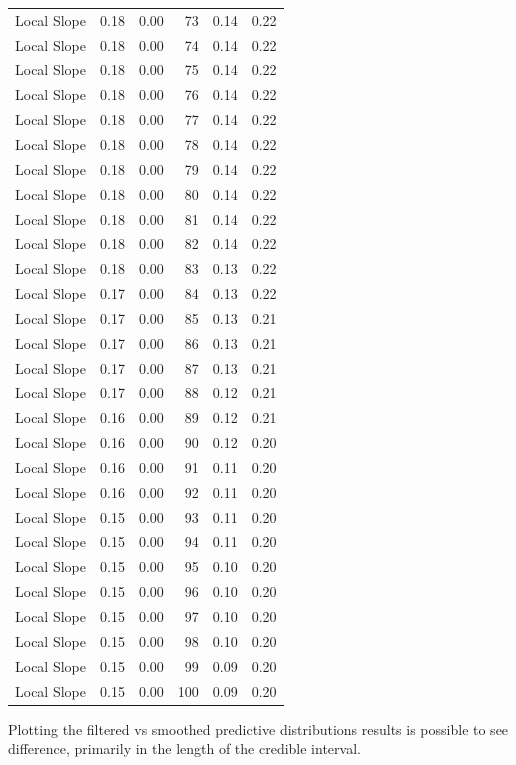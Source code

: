 \documentclass[
]{article}
\begin{document}
\begin{longtable}[]{@{}lrrrrr@{}}
Local Slope & 0.18 & 0.00 & 73 & 0.14 & 0.22 \\
Local Slope & 0.18 & 0.00 & 74 & 0.14 & 0.22 \\
Local Slope & 0.18 & 0.00 & 75 & 0.14 & 0.22 \\
Local Slope & 0.18 & 0.00 & 76 & 0.14 & 0.22 \\
Local Slope & 0.18 & 0.00 & 77 & 0.14 & 0.22 \\
Local Slope & 0.18 & 0.00 & 78 & 0.14 & 0.22 \\
Local Slope & 0.18 & 0.00 & 79 & 0.14 & 0.22 \\
Local Slope & 0.18 & 0.00 & 80 & 0.14 & 0.22 \\
Local Slope & 0.18 & 0.00 & 81 & 0.14 & 0.22 \\
Local Slope & 0.18 & 0.00 & 82 & 0.14 & 0.22 \\
Local Slope & 0.18 & 0.00 & 83 & 0.13 & 0.22 \\
Local Slope & 0.17 & 0.00 & 84 & 0.13 & 0.22 \\
Local Slope & 0.17 & 0.00 & 85 & 0.13 & 0.21 \\
Local Slope & 0.17 & 0.00 & 86 & 0.13 & 0.21 \\
Local Slope & 0.17 & 0.00 & 87 & 0.13 & 0.21 \\
Local Slope & 0.17 & 0.00 & 88 & 0.12 & 0.21 \\
Local Slope & 0.16 & 0.00 & 89 & 0.12 & 0.21 \\
Local Slope & 0.16 & 0.00 & 90 & 0.12 & 0.20 \\
Local Slope & 0.16 & 0.00 & 91 & 0.11 & 0.20 \\
Local Slope & 0.16 & 0.00 & 92 & 0.11 & 0.20 \\
Local Slope & 0.15 & 0.00 & 93 & 0.11 & 0.20 \\
Local Slope & 0.15 & 0.00 & 94 & 0.11 & 0.20 \\
Local Slope & 0.15 & 0.00 & 95 & 0.10 & 0.20 \\
Local Slope & 0.15 & 0.00 & 96 & 0.10 & 0.20 \\
Local Slope & 0.15 & 0.00 & 97 & 0.10 & 0.20 \\
Local Slope & 0.15 & 0.00 & 98 & 0.10 & 0.20 \\
Local Slope & 0.15 & 0.00 & 99 & 0.09 & 0.20 \\
Local Slope & 0.15 & 0.00 & 100 & 0.09 & 0.20 \\
\bottomrule
\end{longtable}

Plotting the filtered vs smoothed predictive distributions results is
possible to see difference, primarily in the length of the credible
interval.
\end{document}
